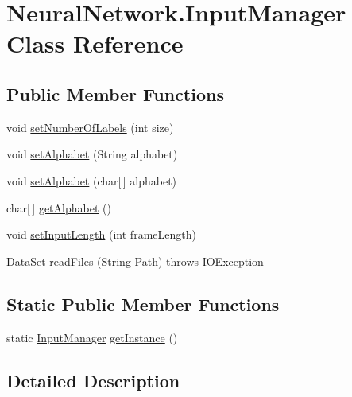 \hypertarget{class_neural_network_1_1_input_manager}{}\section{Neural\+Network.\+Input\+Manager Class Reference}
\label{class_neural_network_1_1_input_manager}
\subsection*{Public Member Functions}
\begin{DoxyCompactItemize}
\item 
void \hyperlink{class_neural_network_1_1_input_manager_afaa90882f9b1ab55d837095bcfed3a12}{set\+Number\+Of\+Labels} (int size)
\item 
void \hyperlink{class_neural_network_1_1_input_manager_af1faef52d6e409ce5ba4ac3f9b23113f}{set\+Alphabet} (String alphabet)
\item 
void \hyperlink{class_neural_network_1_1_input_manager_ad5ead3a963e98ab2136c0443c4d033a6}{set\+Alphabet} (char\mbox{[}$\,$\mbox{]} alphabet)
\item 
char\mbox{[}$\,$\mbox{]} \hyperlink{class_neural_network_1_1_input_manager_a803237466867b60777e9910fddecccae}{get\+Alphabet} ()
\item 
void \hyperlink{class_neural_network_1_1_input_manager_a144c13f4c35429d6a9b95f18907ef81a}{set\+Input\+Length} (int frame\+Length)
\item 
Data\+Set \hyperlink{class_neural_network_1_1_input_manager_a3c6bb32b37ed752f221856f66f9560dc}{read\+Files} (String Path)  throws I\+O\+Exception
\end{DoxyCompactItemize}
\subsection*{Static Public Member Functions}
\begin{DoxyCompactItemize}
\item 
static \hyperlink{class_neural_network_1_1_input_manager}{Input\+Manager} \hyperlink{class_neural_network_1_1_input_manager_ab0178c083635bc42930695d5f5200a6c}{get\+Instance} ()
\end{DoxyCompactItemize}


\subsection{Detailed Description}


